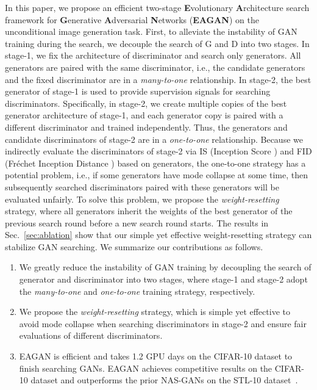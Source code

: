 \documentclass[runningheads]{llncs}
\begin{document}
In this paper, we propose an efficient two-stage \textbf{E}volutionary \textbf{A}rchitecture search framework for \textbf{G}enerative \textbf{A}dversarial \textbf{N}etworks (\textbf{EAGAN}) on the unconditional image generation task. First, to alleviate the instability of GAN training during the search, we decouple the search of G and D into two stages. In stage-1, we fix the architecture of discriminator and search only generators. All generators are paired with the same discriminator, i.e., the candidate generators and the fixed discriminator are in a \textit{many-to-one} relationship. In stage-2, the best generator of stage-1 is used to provide supervision signals for searching discriminators. Specifically, in stage-2, we create multiple copies of the best generator architecture of stage-1, and each generator copy is paired with a different discriminator and trained independently. Thus, the generators and candidate discriminators of stage-2 are in a \textit{one-to-one} relationship. Because we indirectly evaluate the discriminators of stage-2 via IS (Inception Score \cite{IS}) and FID (Fréchet Inception Distance \cite{FID}) based on generators, the one-to-one strategy has a potential problem, i.e., if some generators have mode collapse at some time, then subsequently searched discriminators paired with these generators will be evaluated unfairly. To solve this problem, we propose the \textit{weight-resetting} strategy, where all generators inherit the weights of the best generator of the previous search round before a new search round starts. The results in Sec.~\ref{sec:ablation} show that our simple yet effective weight-resetting strategy can stabilize GAN searching. We summarize our contributions as follows.













\begin{enumerate}
    \item We greatly reduce the instability of GAN training by decoupling the search of generator and discriminator into two stages, where stage-1 and stage-2 adopt the \textit{many-to-one} and \textit{one-to-one} training strategy, respectively.
    \item We propose the \textit{weight-resetting} strategy, which is simple yet effective to avoid mode collapse when searching discriminators in stage-2 and ensure fair evaluations of different discriminators.
    \item EAGAN is efficient and takes 1.2 GPU days on the CIFAR-10 dataset to finish searching GANs. EAGAN achieves competitive results on the CIFAR-10 dataset and outperforms the prior NAS-GANs on the STL-10 dataset~\cite{stl10}.
\end{enumerate}
\end{document}
